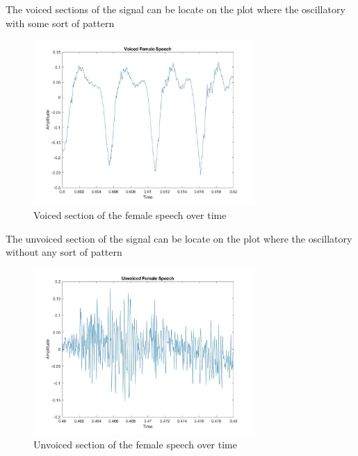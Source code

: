 \documentclass{article}
\begin{document}
    The voiced sections of the signal can be locate on the plot where the oscillatory with some sort of pattern
    \begin{figure}[H]
        \begin{center}
            \leavevmode
            \includegraphics[width=0.75\textwidth]{voiced_time.jpg}
        \end{center}
        \caption{Voiced section of the female speech over time}
        \label{euler:1}
    \end{figure}
    The unvoiced section of the signal can be locate on the plot where the oscillatory without any sort of pattern
    \begin{figure}[H]
        \begin{center}
            \leavevmode
            \includegraphics[width=0.75\textwidth]{unvoiced_time.jpg}
        \end{center}
        \caption{Unvoiced section of the female speech over time}
        \label{euler:1}
    \end{figure}
    \newpage
\end{document}
